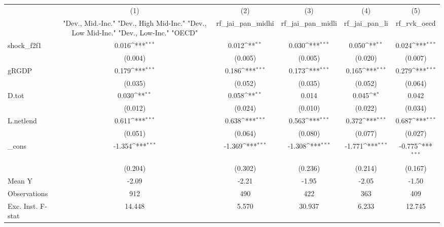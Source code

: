 {
\def\sym#1{\ifmmode^{#1}\else\(^{#1}\)\fi}
\begin{tabular}{l*{5}{c}}
\toprule
            &\multicolumn{1}{c}{(1)}&\multicolumn{1}{c}{(2)}&\multicolumn{1}{c}{(3)}&\multicolumn{1}{c}{(4)}&\multicolumn{1}{c}{(5)}\\
            &\multicolumn{1}{c}{ "Dev., Mid.-Inc." "Dev., High Mid-Inc." "Dev., Low Mid-Inc." "Dev., Low-Inc." "OECD" }&\multicolumn{1}{c}{rf\_jai\_pan\_midhi}&\multicolumn{1}{c}{rf\_jai\_pan\_midli}&\multicolumn{1}{c}{rf\_jai\_pan\_li}&\multicolumn{1}{c}{rf\_rvk\_oecd}\\
\midrule
shock\_f2f1  &       0.016\sym{***}&       0.012\sym{**} &       0.030\sym{***}&       0.050\sym{**} &       0.024\sym{***}\\
            &     (0.004)         &     (0.005)         &     (0.005)         &     (0.020)         &     (0.007)         \\
\addlinespace
gRGDP       &       0.179\sym{***}&       0.186\sym{***}&       0.173\sym{***}&       0.165\sym{***}&       0.279\sym{***}\\
            &     (0.035)         &     (0.052)         &     (0.035)         &     (0.052)         &     (0.064)         \\
\addlinespace
D.tot       &       0.030\sym{**} &       0.058\sym{**} &       0.014         &       0.045\sym{*}  &       0.042         \\
            &     (0.012)         &     (0.024)         &     (0.010)         &     (0.022)         &     (0.034)         \\
\addlinespace
L.netlend   &       0.611\sym{***}&       0.638\sym{***}&       0.563\sym{***}&       0.372\sym{***}&       0.687\sym{***}\\
            &     (0.051)         &     (0.064)         &     (0.080)         &     (0.077)         &     (0.027)         \\
\addlinespace
\_cons      &      -1.354\sym{***}&      -1.369\sym{***}&      -1.308\sym{***}&      -1.771\sym{***}&      -0.775\sym{***}\\
            &     (0.204)         &     (0.302)         &     (0.236)         &     (0.214)         &     (0.167)         \\
\midrule
Mean Y      &       -2.09         &       -2.21         &       -1.95         &       -2.05         &       -1.50         \\
Observations&         912         &         490         &         422         &         363         &         409         \\
Exc. Inst. F-stat&      14.448         &       5.570         &      30.937         &       6.233         &      12.745         \\
\bottomrule
\end{tabular}
}
